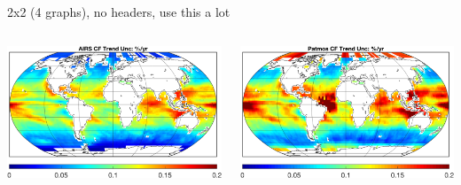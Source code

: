 \documentclass[10pt,t]{beamer}
\begin{document}
\begin{frame}[label={sec:org3c4166f}]{2x2 (4 graphs), no headers, use this a lot}
\vspace{-0.45in}
\begin{columns}
\begin{column}{0.55\columnwidth}
\begin{block}{}
\begin{center}
\includegraphics[width=\linewidth]{./Figs/airs_percent_trend_unc_czoom.png}
\end{center}
\end{block}
\end{column}
\begin{column}{0.55\columnwidth}
\begin{block}{}
\begin{center}
\includegraphics[width=\linewidth]{./Figs/patmos_percent_trend_unc_czoom.png}
\end{center}
\end{block}
\end{column}
\end{columns}
\end{frame}
\end{document}
